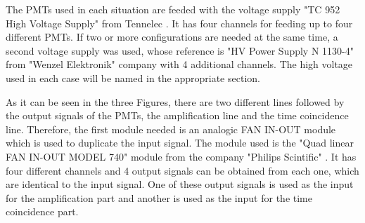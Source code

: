 The PMTs used in each situation are feeded with the voltage supply "TC 952 High Voltage Supply" from Tennelec \cite{DataSheetHVSupplyTennelec}. It has four channels for feeding up to four different PMTs. If two or more configurations are needed at the same time, a second voltage supply was used, whose reference is "HV Power Supply N 1130-4" from "Wenzel Elektronik" company \cite{DataSheetHVSupplyWenzel} with 4 additional channels. The high voltage used in each case will be named in the appropriate section.

As it can be seen in the three Figures, there are two different lines followed by the output signals of the PMTs, the amplification line and the time coincidence line. Therefore, the first module needed is an analogic FAN IN-OUT module which is used to duplicate the input signal. The module used is the "Quad linear FAN IN-OUT MODEL 740" module from the company "Philips Scintific" \cite{DataSheetFANINOUT}. It has four different channels and 4 output signals can be obtained from each one, which are identical to the input signal. One of these output signals is used as the input for the amplification part and another is used as the input for the time coincidence part.

